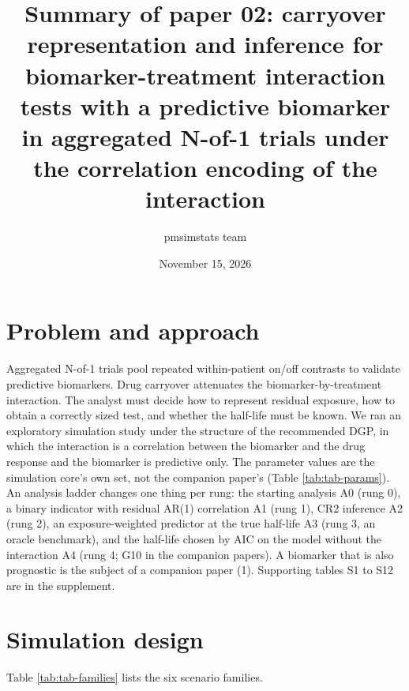 \documentclass[
  11pt,
]{article}
\title{Summary of paper 02: carryover representation and inference for biomarker-treatment interaction tests with a predictive biomarker in aggregated N-of-1 trials under the correlation encoding of the interaction}
\author{pmsimstats team}
\date{November 15, 2026}
\begin{document}
\maketitle

\section*{Problem and approach}\label{problem-and-approach}

Aggregated N-of-1 trials pool repeated within-patient on/off contrasts
to validate predictive biomarkers. Drug carryover attenuates the
biomarker-by-treatment interaction. The analyst must decide how to
represent residual exposure, how to obtain a correctly sized test, and
whether the half-life must be known. We ran an exploratory simulation
study under the structure of the recommended DGP, in which the
interaction is a correlation between the biomarker and the drug
response and the biomarker is predictive only. The parameter values
are the simulation core's own set, not the companion paper's (Table
\ref{tab:tab-params}). An analysis ladder changes one thing per
rung: the starting analysis A0 (rung 0), a binary indicator with
residual AR(1) correlation A1 (rung 1), CR2 inference A2 (rung 2), an
exposure-weighted predictor at the true half-life A3 (rung 3, an
oracle benchmark), and the half-life chosen by AIC on the model
without the interaction A4 (rung 4; G10 in the companion papers). A
biomarker that is also prognostic is the subject of a companion paper
(1). Supporting tables S1 to S12 are in the
supplement.

\section*{Simulation design}\label{simulation-design}

Table \ref{tab:tab-families} lists the six scenario families.
\end{document}
